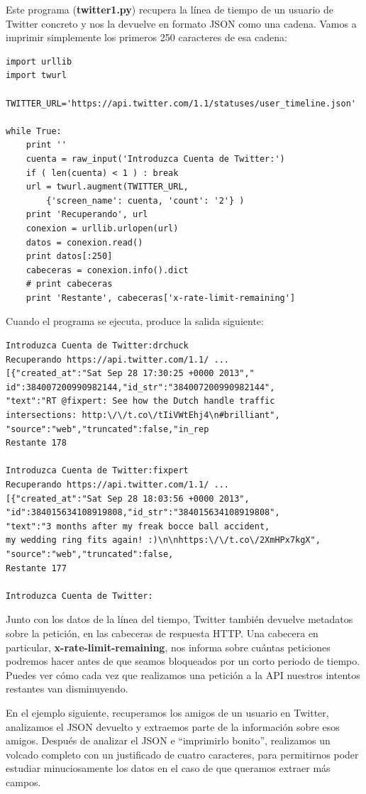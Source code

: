 Este programa ({\bf twitter1.py}) recupera la línea de tiempo
de un usuario de Twitter concreto y nos la devuelve en formato
JSON como una cadena. Vamos a imprimir simplemente los primeros 250
caracteres de esa cadena:

\beforeverb
\begin{verbatim}
import urllib
import twurl

TWITTER_URL='https://api.twitter.com/1.1/statuses/user_timeline.json'

while True:
    print ''
    cuenta = raw_input('Introduzca Cuenta de Twitter:')
    if ( len(cuenta) < 1 ) : break
    url = twurl.augment(TWITTER_URL,
        {'screen_name': cuenta, 'count': '2'} )
    print 'Recuperando', url
    conexion = urllib.urlopen(url)
    datos = conexion.read()
    print datos[:250]
    cabeceras = conexion.info().dict
    # print cabeceras
    print 'Restante', cabeceras['x-rate-limit-remaining']
\end{verbatim}
\afterverb
%
Cuando el programa se ejecuta, produce la salida siguiente: 
 
\beforeverb
\begin{verbatim}
Introduzca Cuenta de Twitter:drchuck
Recuperando https://api.twitter.com/1.1/ ...
[{"created_at":"Sat Sep 28 17:30:25 +0000 2013","
id":384007200990982144,"id_str":"384007200990982144",
"text":"RT @fixpert: See how the Dutch handle traffic 
intersections: http:\/\/t.co\/tIiVWtEhj4\n#brilliant",
"source":"web","truncated":false,"in_rep
Restante 178

Introduzca Cuenta de Twitter:fixpert
Recuperando https://api.twitter.com/1.1/ ...
[{"created_at":"Sat Sep 28 18:03:56 +0000 2013",
"id":384015634108919808,"id_str":"384015634108919808",
"text":"3 months after my freak bocce ball accident, 
my wedding ring fits again! :)\n\nhttps:\/\/t.co\/2XmHPx7kgX",
"source":"web","truncated":false,
Restante 177

Introduzca Cuenta de Twitter:
\end{verbatim}
\afterverb
%
Junto con los datos de la línea del tiempo, Twitter también devuelve
metadatos sobre la petición, en las cabeceras de respuesta HTTP.
Una cabecera en particular, {\bf x-rate-limit-remaining}, nos informa
sobre cuántas peticiones podremos hacer antes de que seamos bloqueados
por un corto periodo de tiempo. Puedes ver cómo cada vez que realizamos
una petición a la API nuestros intentos restantes van disminuyendo.

En el ejemplo siguiente, recuperamos los amigos de un usuario en Twitter,
analizamos el JSON devuelto y extraemos parte de la información
sobre esos amigos. Después de analizar el JSON e ``imprimirlo bonito'',
realizamos un volcado completo con un justificado de cuatro caracteres, para permitirnos
poder estudiar minuciosamente los datos en el caso de que queramos extraer más campos.

